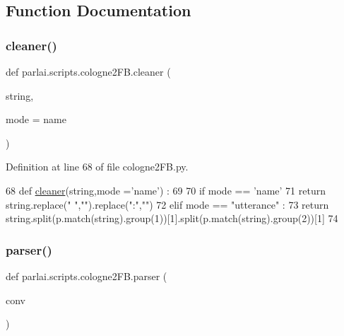 \subsection{Function Documentation}
\mbox{\label{namespaceparlai_1_1scripts_1_1cologne2FB_a8a2fb9f6897ef06ab2421d6682dca667}} 
\subsubsection{\texorpdfstring{cleaner()}{cleaner()}}
{\footnotesize\ttfamily def parlai.\+scripts.\+cologne2\+F\+B.\+cleaner (\begin{DoxyParamCaption}\item[{}]{string,  }\item[{}]{mode = {\ttfamily \textquotesingle{}name\textquotesingle{}} }\end{DoxyParamCaption})}



Definition at line 68 of file cologne2\+F\+B.\+py.


\begin{DoxyCode}
68 \textcolor{keyword}{def }\hyperlink{namespaceparlai_1_1scripts_1_1cologne2FB_a8a2fb9f6897ef06ab2421d6682dca667}{cleaner}(string,mode ='name') : 
69 
70     \textcolor{keywordflow}{if} mode == \textcolor{stringliteral}{'name'}
71         \textcolor{keywordflow}{return} string.replace(\textcolor{stringliteral}{" "},\textcolor{stringliteral}{""}).replace(\textcolor{stringliteral}{":"},\textcolor{stringliteral}{""})
72     \textcolor{keywordflow}{elif} mode == \textcolor{stringliteral}{"utterance"} : 
73         \textcolor{keywordflow}{return} string.split(p.match(string).group(1))[1].split(p.match(string).group(2))[1]
74 
\end{DoxyCode}
\mbox{\label{namespaceparlai_1_1scripts_1_1cologne2FB_a3d8c5febb71cafe49cc8a5a71c4ba2c5}} 
\subsubsection{\texorpdfstring{parser()}{parser()}}
{\footnotesize\ttfamily def parlai.\+scripts.\+cologne2\+F\+B.\+parser (\begin{DoxyParamCaption}\item[{}]{conv }\end{DoxyParamCaption})}



